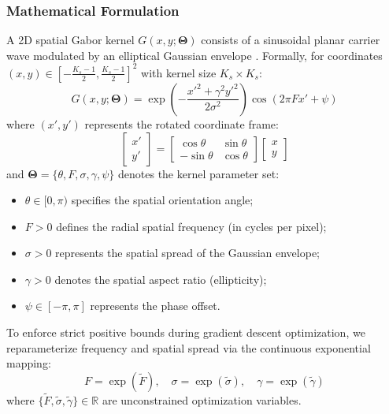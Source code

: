 \subsubsection{Mathematical Formulation}
A 2D spatial Gabor kernel $G(x, y; \mathbf{\Theta})$ consists of a sinusoidal planar carrier wave modulated by an elliptical Gaussian envelope \cite{daugman1985uncertainty}. Formally, for coordinates $(x, y) \in [-\frac{K_s-1}{2}, \frac{K_s-1}{2}]^2$ with kernel size $K_s \times K_s$:
\begin{equation}
    G(x, y; \mathbf{\Theta}) = \exp\left( -\frac{{x'}^2 + \gamma^2 {y'}^2}{2\sigma^2} \right) \cos\left( 2\pi F x' + \psi \right)
    \label{eq:gabor_def}
\end{equation}
where $(x', y')$ represents the rotated coordinate frame:
\begin{equation}
    \begin{bmatrix} x' \\ y' \end{bmatrix} = \begin{bmatrix} \cos\theta & \sin\theta \\ -\sin\theta & \cos\theta \end{bmatrix} \begin{bmatrix} x \\ y \end{bmatrix}
\end{equation}
and $\mathbf{\Theta} = \{\theta, F, \sigma, \gamma, \psi\}$ denotes the kernel parameter set:
\begin{itemize}
    \item $\theta \in [0, \pi)$ specifies the spatial orientation angle;
    \item $F > 0$ defines the radial spatial frequency (in cycles per pixel);
    \item $\sigma > 0$ represents the spatial spread of the Gaussian envelope;
    \item $\gamma > 0$ denotes the spatial aspect ratio (ellipticity);
    \item $\psi \in [-\pi, \pi]$ represents the phase offset.
\end{itemize}

To enforce strict positive bounds during gradient descent optimization, we reparameterize frequency and spatial spread via the continuous exponential mapping:
\begin{equation}
    F = \exp(\tilde{F}), \quad \sigma = \exp(\tilde{\sigma}), \quad \gamma = \exp(\tilde{\gamma})
\end{equation}
where $\{\tilde{F}, \tilde{\sigma}, \tilde{\gamma}\} \in \mathbb{R}$ are unconstrained optimization variables.

